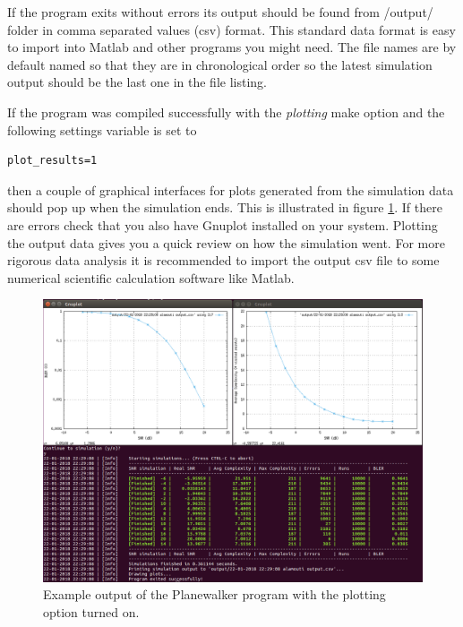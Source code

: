 \documentclass[english,12pt,a4paper,pdftex,sci,utf8]{aaltothesis}
\begin{document}
If the program exits without errors its output should be found from /output/ folder in comma separated values (csv) format. This standard data format is easy to import into Matlab and other programs you might need. The file names are by default named so that they are in chronological order so the latest simulation output should be the last one in the file listing.
\par If the program was compiled successfully with the \emph{plotting} make option and the following settings variable is set to
\begin{verbatim}
plot_results=1 
\end{verbatim}
then a couple of graphical interfaces for plots generated from the simulation data should pop up when the simulation ends. This is illustrated in figure \ref{fig:output}. If there are errors check that you also have Gnuplot installed on your system. Plotting the output data gives you a quick review on how the simulation went. For more rigorous data analysis it is recommended to import the output csv file to some numerical scientific calculation software like Matlab.

\begin{figure}[htb]
  \centering
\includegraphics[width=\linewidth]{pwalk_output}
  \caption{Example output of the Planewalker program with the plotting option turned on.}
  \label{fig:output}
\end{figure}
\end{document}

